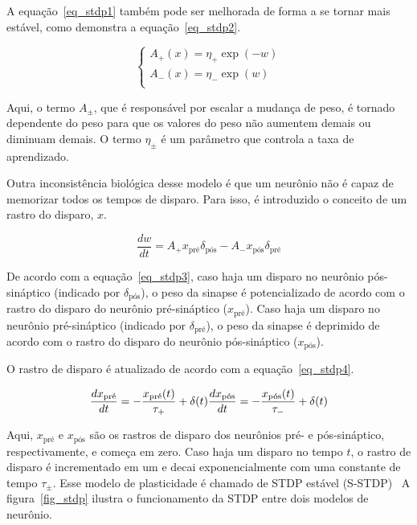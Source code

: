 A equação~\ref{eq_stdp1} também pode ser melhorada de forma a se tornar mais estável, como demonstra a equação~\ref{eq_stdp2}.

\begin{equation}
\label{eq_stdp2}
\begin{cases}
    A_{+}(x) = \eta_{+} \exp(-w)\\
    A_{-}(x) = \eta_{-} \exp(w)\\
\end{cases}
\end{equation}

Aqui, o termo $A_{\pm}$, que é responsável por escalar a mudança de peso, é tornado dependente do peso para que os valores do peso
não aumentem demais ou diminuam demais. O termo $\eta_{\pm}$ é um parâmetro que controla a taxa de aprendizado.

Outra inconsistência biológica desse modelo é que um neurônio não é capaz de memorizar todos os tempos de disparo. Para isso, é
introduzido o conceito de um rastro do disparo, $x$.

\begin{equation}
\label{eq_stdp3}
\frac{dw}{dt} = A_{+} x_{\text{pré}} \delta_{\text{pós}} - A_{-} x_{\text{pós}} \delta_{\text{pré}}
\end{equation}

De acordo com a equação~\ref{eq_stdp3}, caso haja um disparo no neurônio pós-sináptico (indicado por $\delta_{\text{pós}}$), o peso da
sinapse é potencializado de acordo com o rastro do disparo do neurônio pré-sináptico ($x_{\text{pré}}$). Caso haja um disparo no
neurônio pré-sináptico (indicado por $\delta_{\text{pré}}$), o peso da sinapse é deprimido de acordo com o rastro do disparo do neurônio
pós-sináptico ($x_{\text{pós}}$).

O rastro de disparo é atualizado de acordo com a equação~\ref{eq_stdp4}.

\begin{equation}
\label{eq_stdp4}
\frac{dx_{\text{\text{pré}}}}{dt} = -\frac{x_{\text{pré}}(t)}{\tau_{+}}+\delta(t) \\
\frac{dx_{\text{pós}}}{dt} = -\frac{x_{\text{pós}}(t)}{\tau_{-}}+\delta(t)
\end{equation}

Aqui, $x_{\text{pré}}$ e $x_{\text{pós}}$ são os rastros de disparo dos neurônios pré- e pós-sináptico, respectivamente, e começa
em zero. Caso haja um disparo no tempo $t$, o rastro de disparo é incrementado em um e decai exponencialmente com uma constante de
tempo $\tau_{\pm}$. Esse modelo de plasticidade é chamado de STDP estável (S-STDP)~\cite{paredes-vallesUnsupervised2018} A
figura~\ref{fig_stdp} ilustra o funcionamento da STDP entre dois modelos de neurônio.

